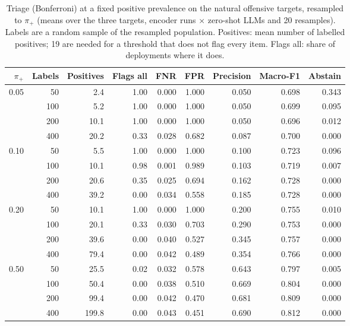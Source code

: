 \begin{table}[t]
\centering
\small
\caption{Triage (Bonferroni) at a fixed positive prevalence on the natural offensive targets, resampled to $\pi_+$ (means over the three targets, encoder runs $\times$ zero-shot LLMs and 20 resamples). Labels are a random sample of the resampled population. Positives: mean number of labelled positives; 19 are needed for a threshold that does not flag every item. Flags all: share of deployments where it does.}
\label{tab:triage-prevalence-stress}
\begin{tabular}{rrrrrrrrr}
\toprule
$\pi_+$ & Labels & Positives & Flags all & FNR & FPR & Precision & Macro-F1 & Abstain \\
\midrule
0.05 & 50 & 2.4 & 1.00 & 0.000 & 1.000 & 0.050 & 0.698 & 0.343 \\
 & 100 & 5.2 & 1.00 & 0.000 & 1.000 & 0.050 & 0.699 & 0.095 \\
 & 200 & 10.1 & 1.00 & 0.000 & 1.000 & 0.050 & 0.696 & 0.012 \\
 & 400 & 20.2 & 0.33 & 0.028 & 0.682 & 0.087 & 0.700 & 0.000 \\
\midrule
0.10 & 50 & 5.5 & 1.00 & 0.000 & 1.000 & 0.100 & 0.723 & 0.096 \\
 & 100 & 10.1 & 0.98 & 0.001 & 0.989 & 0.103 & 0.719 & 0.007 \\
 & 200 & 20.6 & 0.35 & 0.025 & 0.694 & 0.162 & 0.728 & 0.000 \\
 & 400 & 39.2 & 0.00 & 0.034 & 0.558 & 0.185 & 0.728 & 0.000 \\
\midrule
0.20 & 50 & 10.1 & 1.00 & 0.000 & 1.000 & 0.200 & 0.755 & 0.010 \\
 & 100 & 20.1 & 0.33 & 0.030 & 0.703 & 0.290 & 0.753 & 0.000 \\
 & 200 & 39.6 & 0.00 & 0.040 & 0.527 & 0.345 & 0.757 & 0.000 \\
 & 400 & 79.4 & 0.00 & 0.042 & 0.489 & 0.354 & 0.766 & 0.000 \\
\midrule
0.50 & 50 & 25.5 & 0.02 & 0.032 & 0.578 & 0.643 & 0.797 & 0.005 \\
 & 100 & 50.4 & 0.00 & 0.038 & 0.510 & 0.669 & 0.804 & 0.000 \\
 & 200 & 99.4 & 0.00 & 0.042 & 0.470 & 0.681 & 0.809 & 0.000 \\
 & 400 & 199.8 & 0.00 & 0.043 & 0.451 & 0.690 & 0.812 & 0.000 \\
\bottomrule
\end{tabular}
\end{table}
